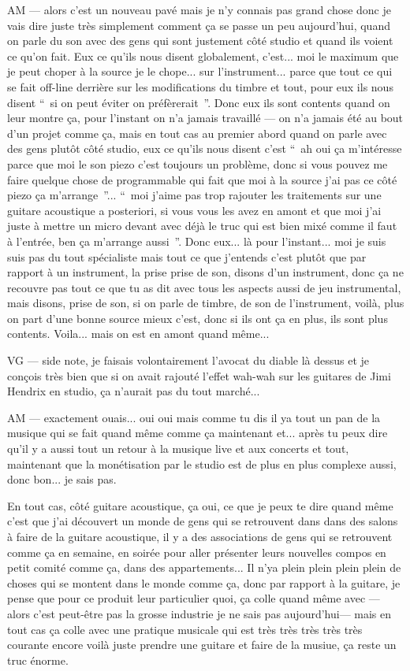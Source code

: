 AM — alors c'est un nouveau pavé mais je n'y connais pas grand chose donc je vais dire juste très simplement comment ça se passe un peu aujourd'hui, quand on parle du son avec des gens qui sont justement côté studio et quand ils voient ce qu'on fait. Eux ce qu'ils nous disent globalement, c'est... moi le maximum que je peut choper à la source je le chope... sur l'instrument... parce que tout ce qui se fait off-line derrière sur les modifications du timbre et tout, pour eux ils nous disent “ si on peut éviter on préfèrerait ”. Donc eux ils sont contents quand on leur montre ça, pour l'instant on n'a jamais travaillé — on n'a jamais été au bout d'un projet comme ça, mais en tout cas au premier abord quand on parle avec des gens plutôt côté studio, eux ce qu'ils nous disent c'est “ ah oui ça m'intéresse parce que moi le son piezo c'est toujours un problème, donc si vous pouvez me faire quelque chose de programmable qui fait que moi à la source j'ai pas ce côté piezo ça m'arrange ”... “ moi j'aime pas trop rajouter les traitements sur une guitare acoustique a posteriori, si vous vous les avez en amont et que moi j'ai juste à mettre un micro devant avec déjà le truc qui est bien mixé comme il faut à l'entrée, ben ça m'arrange aussi ”. Donc eux... là pour l'instant... moi je suis suis pas du tout spécialiste mais tout ce que j'entends c'est plutôt que par rapport à un instrument, la prise prise de son, disons d'un instrument, donc ça ne recouvre pas tout ce que tu as dit avec tous les aspects aussi de jeu instrumental, mais disons, prise de son, si on parle de timbre, de son de l'instrument, voilà, plus on part d'une bonne source mieux c'est, donc si ils ont ça en plus, ils sont plus contents. Voila... mais on est en amont quand même... 

VG —  side note, je faisais volontairement l'avocat du diable là dessus et je conçois très bien que si on avait rajouté l'effet wah-wah sur les guitares de Jimi Hendrix en studio, ça n'aurait pas du tout marché... 

AM — exactement ouais... oui oui mais comme tu dis il ya tout un pan de la musique qui se fait quand même comme ça maintenant et... après tu peux dire qu'il y a aussi tout un retour à la musique live et aux concerts et tout, maintenant que la monétisation par le studio est de plus en plus complexe aussi, donc bon... je sais pas. 

En tout cas, côté guitare acoustique, ça oui, ce que je peux te dire quand même c'est que j'ai découvert un monde de gens qui se retrouvent dans dans des salons à faire de la guitare acoustique, il y a des associations de gens qui se retrouvent comme ça en semaine, en soirée pour aller présenter leurs nouvelles compos en petit comité comme ça, dans des appartements... Il n'ya plein plein plein plein de choses qui se montent dans le monde comme ça, donc par rapport à la guitare, je pense que pour ce produit leur particulier quoi, ça colle quand même avec — alors c'est peut-être pas la grosse industrie je ne sais pas aujourd'hui— mais en tout cas ça colle avec une pratique musicale qui est très très très très très courante encore voilà juste prendre une guitare et faire de la musiue, ça reste un truc énorme.


